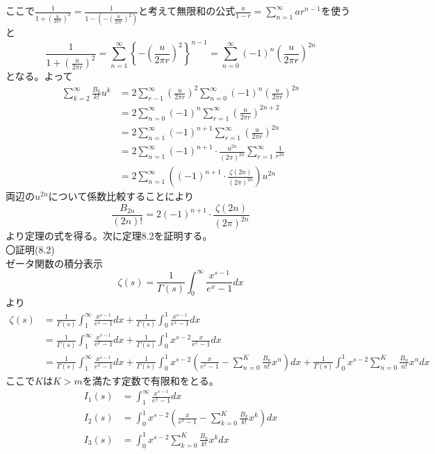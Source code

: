 \documentclass{jsarticle}
\begin{document}
ここで\(\displaystyle\frac{1}{1+\left(\frac{u}{2\pi r}\right)^2}=\frac{1}{1-\left(-\left(\frac{u}{2\pi r}\right)^2\right)}\)と考えて無限和の公式\(\displaystyle\frac{a}{1-r}=\sum_{n=1}^{\infty}ar^{n-1}\)を使うと
\[\frac{1}{1+\left(\frac{u}{2\pi r}\right)^2}=\sum_{n=1}^{\infty}\left\{-\left(\frac{u}{2\pi r}\right)^2\right\}^{n-1}=\sum_{n=0}^{\infty}(-1)^{n}\left(\frac{u}{2\pi r}\right)^{2n}\]
となる。よって
\begin{align*}
\sum_{k=2}^{\infty}\frac{B_{k}}{k!}u^{k}&=2\sum_{r-1}^{\infty}\left(\frac{u}{2\pi r}\right)^{2}\sum_{n=0}^{\infty}(-1)^{n}\left(\frac{u}{2\pi r}\right)^{2n}\\
&=2\sum_{n=0}^{\infty}(-1)^{n}\sum_{r=1}^{\infty}\left(\frac{u}{2\pi r}\right)^{2n+2}\\
&=2\sum_{n=1}^{\infty}(-1)^{n+1}\sum_{r=1}^{\infty}\left(\frac{u}{2\pi r}\right)^{2n}\\
&=2\sum_{n=1}^{\infty}(-1)^{n+1}\cdot\frac{u^{2n}}{(2\pi)^{2n}}\sum_{r=1}^{\infty}\frac{1}{r^{2n}}\\
&=2\sum_{n=1}^{\infty}\left((-1)^{n+1}\cdot\frac{\zeta(2n)}{(2\pi)^{2n}}\right)u^{2n}
\end{align*}
両辺の\(u^{2n}\)について係数比較することにより
\[\frac{B_{2n}}{(2n)!}=2(-1)^{n+1}\cdot\frac{\zeta(2n)}{(2\pi)^{2n}}\]
より定理の式を得る。次に定理8.2を証明する。\\
〇証明(8.2)\\
ゼータ関数の積分表示
\[\zeta(s)=\frac{1}{\Gamma(s)}\int_{0}^{\infty}\frac{x^{s-1}}{e^{x}-1}dx\]
より
\begin{align*}
\zeta(s)&=\frac{1}{\Gamma(s)}\int_{1}^{\infty}\frac{x^{s-1}}{e^{x}-1}dx+\frac{1}{\Gamma(s)}\int_{0}^{1}\frac{x^{s-1}}{e^{x}-1}dx\\
&=\frac{1}{\Gamma(s)}\int_{1}^{\infty}\frac{x^{s-1}}{e^{x}-1}dx+\frac{1}{\Gamma(s)}\int_{0}^{1}x^{s-2}\frac{x}{e^{x}-1}dx\\
&=\frac{1}{\Gamma(s)}\int_{1}^{\infty}\frac{x^{s-1}}{e^{x}-1}dx+\frac{1}{\Gamma(s)}\int_{0}^{1}x^{s-2}\left(\frac{x}{e^{x}-1}-\sum_{n=0}^{K}\frac{B_{n}}{n!}x^{n}\right)dx+\frac{1}{\Gamma(s)}\int_{0}^{1}x^{s-2}\sum_{n=0}^{K}\frac{B_{n}}{n!}x^{n}dx
\end{align*}
ここで\(K\)は\(K>m\)を満たす定数で有限和をとる。
\begin{align*}
I_{1}(s)&=\int_{1}^{\infty}\frac{x^{s-1}}{e^{x}-1}dx\\
I_{2}(s)&=\int_{0}^{1}x^{s-2}\left(\frac{x}{e^{x}-1}-\sum_{k=0}^{K}\frac{B_{k}}{k!}x^{k}\right)dx\\
I_{3}(s)&=\int_{0}^{1}x^{s-2}\sum_{k=0}^{K}\frac{B_{k}}{k!}x^{k}dx
\end{align*}
\end{document}
